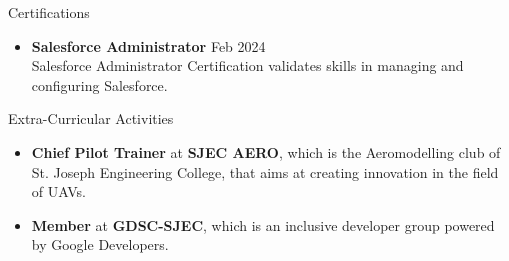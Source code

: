 \documentclass{resume} %
\begin{document}
\begin{rSection}{Certifications} 
    \begin{itemize}
        \item \textbf{Salesforce Administrator} \hfill Feb 2024\\
        Salesforce Administrator Certification validates skills in managing and configuring Salesforce.
    \end{itemize}
    
    
    \end{rSection}
    \begin{rSection}{Extra-Curricular Activities} 
\begin{itemize}
    \item 	\textbf{Chief Pilot Trainer} at \textbf{SJEC AERO}, which is the Aeromodelling club of St. Joseph Engineering College, that aims at creating innovation in the field of UAVs.
    \item	\textbf{Member} at \textbf{GDSC-SJEC}, which is an inclusive developer group powered by Google Developers.

\end{itemize}


\end{rSection}
\end{document}
